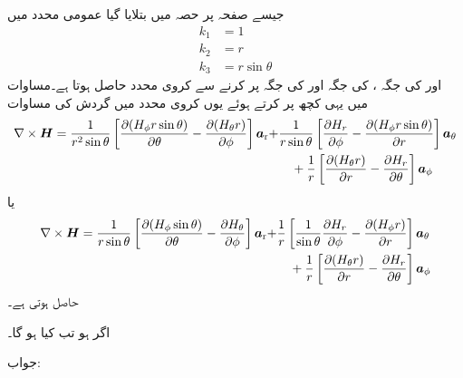 جیسے صفحہ  پر حصہ  میں بتلایا گیا عمومی محدد میں
\begin{align*}
k_1&=1\\
k_2&=r\\
k_3&= r \sin \theta
\end{align*}
اور  کی جگہ ،  کی جگہ  اور  کی جگہ  پر کرنے سے کروی محدد حاصل ہوتا ہے۔مساوات  میں یہی کچھ پر کرتے ہوئے یوں کروی محدد میں گردش کی مساوات
\begin{align*}
\nabla \times {\ensuremath{{\boldsymbol{H}}}}=\frac{1}{r^2 \sin \theta}\left[\frac{\partial (H_\phi r \sin \theta)}{\partial \theta}-\frac{\partial (H_{\theta} r)}{\partial \phi} \right]{\boldsymbol{a}}_{\textup{r}}+&\frac{1}{r \sin \theta}\left[\frac{\partial H_r }{\partial \phi}-\frac{\partial (H_\phi  r \sin \theta)}{\partial r} \right]{\boldsymbol{a}}_{\theta}\\
&\quad +\frac{1}{r}\left[\frac{\partial (H_\theta r)}{\partial r}-\frac{\partial H_r }{\partial \theta} \right]{\boldsymbol{a}}_{\phi}
\end{align*}
یا
\begin{gather}
\begin{aligned}\label{مساوات_مقناطیسی_کروی_گردش}
\nabla \times {\ensuremath{{\boldsymbol{H}}}}=\frac{1}{r \sin \theta}\left[\frac{\partial (H_\phi  \sin \theta)}{\partial \theta}-\frac{\partial H_{\theta} }{\partial \phi} \right]{\boldsymbol{a}}_{\textup{r}}+&\frac{1}{r }\left[\frac{1}{\sin \theta}\frac{\partial H_r }{\partial \phi}-\frac{\partial (H_\phi  r )}{\partial r} \right]{\boldsymbol{a}}_{\theta}\\
&\quad +\frac{1}{r}\left[\frac{\partial (H_\theta r)}{\partial r}-\frac{\partial H_r }{\partial \theta} \right]{\boldsymbol{a}}_{\phi}
\end{aligned}
\end{gather}
حاصل ہوتی ہے۔

اگر  ہو تب  کیا ہو گا۔

جواب:

